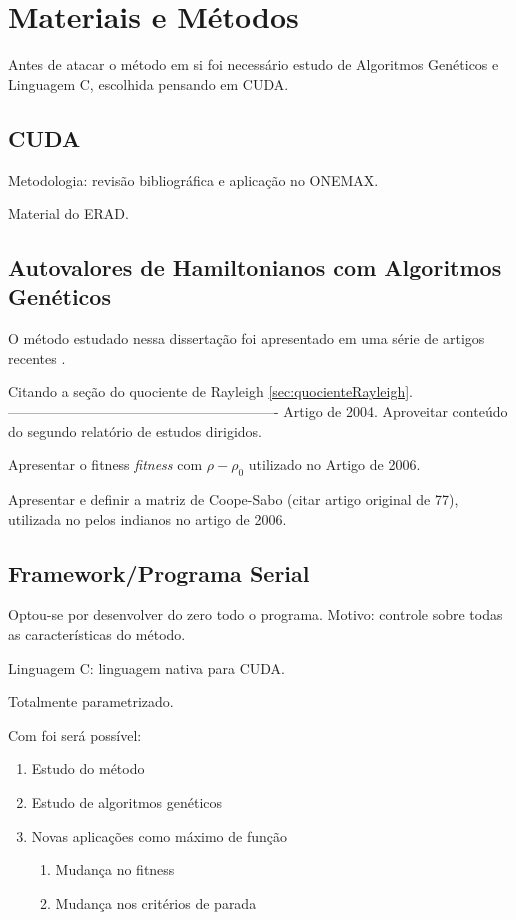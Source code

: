 \chapter{Materiais e Métodos\label{cap:metodologia}}

Antes de atacar o método em si foi necessário estudo de Algoritmos Genéticos e Linguagem C, escolhida pensando em CUDA.

\section{CUDA}

Metodologia: revisão bibliográfica e aplicação no ONEMAX.

Material do ERAD.

\section{Autovalores de Hamiltonianos com Algoritmos Genéticos\label{sec:metodo}}

	O método estudado nessa dissertação foi apresentado em uma série de artigos recentes \cite{metodo2004, metodo2006, metodo2008, metodo2009, metodo2011}. 
	
	
	
	
	
	Citando a seção do quociente de Rayleigh \ref{sec:quocienteRayleigh}.
----------------------------------------------------------
	Artigo de 2004.	Aproveitar conteúdo do segundo relatório de estudos dirigidos.

	Apresentar o fitness \textit{fitness} com $\rho - \rho_0$ utilizado no Artigo de 2006.

	Apresentar e definir a matriz de Coope-Sabo (citar artigo original de 77), utilizada no pelos indianos no artigo de 2006.
	
\section{Framework/Programa Serial}

	Optou-se por desenvolver do zero todo o programa. Motivo: controle sobre todas as características do método.

	Linguagem C: linguagem nativa para CUDA.

	Totalmente parametrizado. 

	Com foi será possível:

	\begin{enumerate}
		\item Estudo do método 
		\item Estudo de algoritmos genéticos
		\item Novas aplicações como máximo de função
		\begin{enumerate}
			\item Mudança no fitness 
			\item Mudança nos critérios de parada
		\end{enumerate}	
	\end{enumerate}


